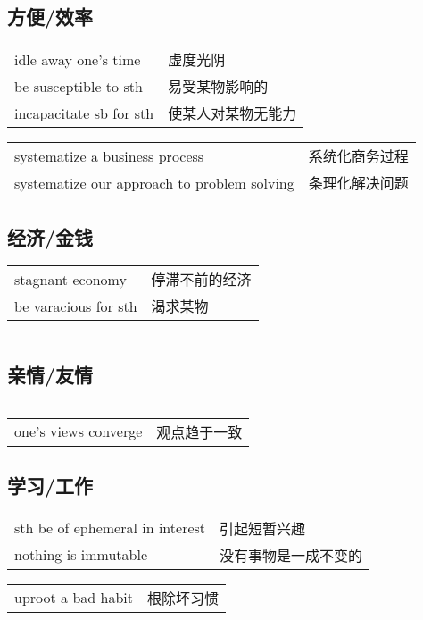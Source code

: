 \subsection{方便/效率}

\begin{tabular}{ll}
    idle away one's time    & 虚度光阴      \\
    be susceptible to sth   & 易受某物影响的   \\
    incapacitate sb for sth & 使某人对某物无能力 \\
\end{tabular}

\begin{tabular}{ll}
    systematize a business process              & 系统化商务过程 \\
    systematize our approach to problem solving & 条理化解决问题 \\
\end{tabular}

\subsection{经济/金钱}

\begin{tabular}{ll}
    stagnant economy     & 停滞不前的经济 \\
    be varacious for sth & 渴求某物    \\
\end{tabular}

\begin{tabular}{ll}
\end{tabular}

\subsection{亲情/友情}

\begin{tabular}{ll}
\end{tabular}

\begin{tabular}{ll}
    one's views converge & 观点趋于一致 \\
\end{tabular}

\subsection{学习/工作}

\begin{tabular}{ll}
    sth be of ephemeral in interest & 引起短暂兴趣     \\
    nothing is immutable            & 没有事物是一成不变的 \\
\end{tabular}

\begin{tabular}{ll}
    uproot a bad habit & 根除坏习惯 \\
\end{tabular}
